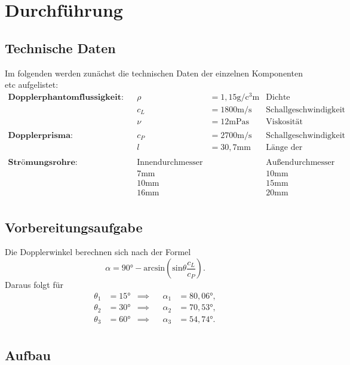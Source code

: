 \section{Durchführung}
\label{sec:Durchführung}
\subsection{Technische Daten}
Im folgenden werden zunächst die technischen Daten der einzelnen Komponenten etc aufgelistet:
\begin{align*}
    \textbf{Dopplerphantomflussigkeit:} && \rho &= 1,15  \unit\gram / \unit{\cubic\centi\meter} & \text{Dichte} \\
    && c_L &= 1800 \unit\meter / \unit\second & \text{Schallgeschwindigkeit} \\
    && \nu &= 12 \unit{\milli\pascal\second} & \text{Viskosität} \\
    \\
    \textbf{Dopplerprisma:} && c_P &= 2700 \unit\meter / \unit\second & \text{Schallgeschwindigkeit} \\
    && l &= 30,7 \unit{\milli\meter} & \text{Länge der Vorlaufstrecke} \\
    \\
    \textbf{Strömungsrohre:} && \text{Innendurchmesser} && \text{Außendurchmesser} \\
    && 7 \unit{\milli\meter} && 10 \unit{\milli\meter} \\
    && 10 \unit{\milli\meter} && 15 \unit{\milli\meter} \\
    && 16 \unit{\milli\meter} && 20 \unit{\milli\meter} \\
\end{align*}

\subsection{Vorbereitungsaufgabe}
Die Dopplerwinkel berechnen sich nach der Formel
\begin{equation}
    \alpha = 90° - \text{arcsin}\left(\text{sin} \theta \frac{c_L}{c_P}\right).
\end{equation}
Daraus folgt für
\begin{align*}
    \theta_1 &= 15° &\implies&& \alpha_1 &= 80,06°, \\
    \theta_2 &= 30° &\implies&& \alpha_2 &= 70,53°, \\
    \theta_3 &= 60° &\implies&& \alpha_3 &= 54,74°. \\
\end{align*}
\subsection{Aufbau}
